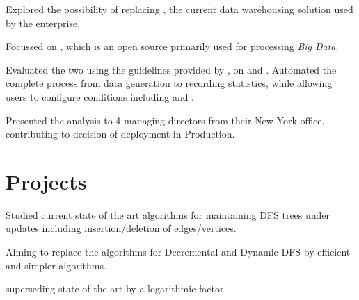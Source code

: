 \documentclass[a4paper]{norm-resume}
\begin{document}
  
\begin{tightitemize}
        \small
        {
        \item Explored the possibility of  replacing , the current data warehousing solution used by the enterprise.
        \item Focussed on , which is an open source  primarily used for processing \textit{Big Data}.
        \item Evaluated the two using the guidelines provided by , on  and . Automated the complete process from data generation to recording statistics, while allowing users to configure conditions including  and .
        \item Presented the analysis to 4 managing directors from their New York office, contributing to decision of deployment in Production.
        }
\end{tightitemize}

\vspace{3mm} %


\section{Projects \hrulefill}

\vspace{2mm}

                
\begin{tightitemize}
        \small{
        \item Studied current state of the art algorithms for maintaining DFS trees under updates including insertion/deletion of edges/vertices.
        \item Aiming to replace the algorithms for Decremental and Dynamic DFS by efficient and simpler algorithms.
        \item {} superseding state-of-the-art by a logarithmic factor.
        }
\end{tightitemize}
\end{document}
